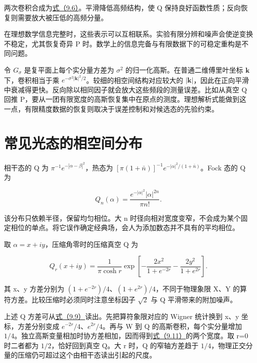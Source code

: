 \documentclass[UTF8,a4paper,zihao=-4,openany,fontset=fandol]{ctexbook}
\begin{document}
两次卷积合成为\hyperref[eq:9.6]{式（9.6）}。平滑降低高频结构，使 Q 保持良好函数性质；反向恢复则需要放大被压低的高频分量。



在理想数学信息完整时，这些表示可以互相联系。实验有限分辨和噪声会使逆变换不稳定，尤其恢复奇异 P 时。数学上的信息完备与有限数据下的可稳定重构是不同问题。



令 $G_\sigma$ 是复平面上每个实分量方差为 $\sigma^2$ 的归一化高斯。在普通二维傅里叶坐标 $\mathbf k$ 下，卷积相当于乘 $e^{-\sigma^2|\mathbf k|^2/2}$。较细的相空间结构对应较大的 $|\mathbf k|$，因此在正向平滑中衰减得更快。反向除以相同因子就会放大这些频段的测量误差。比如从真空 Q 回推 P，要从一团有限宽度的高斯恢复集中在原点的测度。理想解析式能做到这一点，有限精度数据的恢复则取决于误差控制和对候选态的先验约束。



\section{常见光态的相空间分布}\label{sec:09:9}


相干态的 Q 为 $\pi^{-1}e^{-|\alpha-\beta|^2}$，热态为 $[\pi(1+\bar n)]^{-1}e^{-|\alpha|^2/(1+\bar n)}$。Fock 态的 Q 为



\begin{equation*}
Q_n(\alpha)=\frac{e^{-|\alpha|^2}|\alpha|^{2n}}{\pi n!}.
\tag{9.10}\label{eq:9.10}
\end{equation*}


该分布只依赖半径，保留均匀相位。大 n 时径向相对宽度变窄，不会成为某个固定相位的单点。将它误作确定经典场，会人为添加数态并不具有的平均相位。



取 $\alpha=x+iy$，压缩角零时的压缩真空 Q 为



\begin{equation*}
Q_r(x+iy)=\frac1{\pi\cosh r}
\exp\!\left[-\frac{2x^2}{1+e^{-2r}}
-\frac{2y^2}{1+e^{2r}}\right].
\tag{9.11}\label{eq:9.11}
\end{equation*}


其 x、y 方差分别为 $(1+e^{-2r})/4$、$(1+e^{2r})/4$，不同于物理象限 X、Y 的算符方差。比较压缩时必须同时注意坐标因子 $\sqrt2$ 与 Q 平滑带来的附加噪声。



上述 Q 方差可从\hyperref[eq:9.9]{式（9.9）}读出。先把算符象限对应的 Wigner 统计换到 x、y 坐标，方差分别变成 $e^{-2r}/4$、$e^{2r}/4$。再与 W 到 Q 的高斯卷积，每个实分量增加 $1/4$。独立高斯变量相加时协方差相加，因而得到\hyperref[eq:9.11]{式（9.11）}的两个宽度。取 r=0 时二者都为 $1/2$，恰好回到真空 Q。大 r 时，Q 的窄轴方差趋于 $1/4$，物理正交分量的压缩仍可超过这个由相干态读出引起的尺度。
\end{document}
